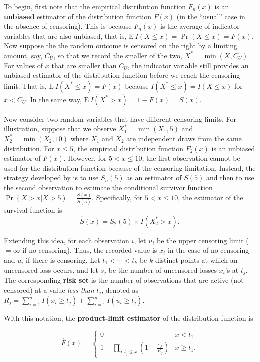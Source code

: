 \documentclass[]{book}
\theoremstyle{definition}
\theoremstyle{definition}
\theoremstyle{definition}
\theoremstyle{remark}
\begin{document}
To begin, first note that the empirical distribution function \(F_n(x)\)
is an \textbf{unbiased} estimator of the distribution function \(F(x)\)
(in the ``usual'' case in the absence of censoring). This is because
\(F_n(x)\) is the average of indicator variables that are also unbiased,
that is, \(\mathrm{E~} I(X \le x) = \Pr(X \le x) = F(x)\). Now suppose
the the random outcome is censored on the right by a limiting amount,
say, \(C_U\), so that we record the smaller of the two,
\(X^* = \min(X, C_U)\). For values of \(x\) that are smaller than
\(C_U\), the indicator variable still provides an unbiased estimator of
the distribution function before we reach the censoring limit. That is,
\(\mathrm{E~} I(X^* \le x) = F(x)\) because
\(I(X^* \le x) = I(X \le x)\) for \(x < C_U\). In the same way,
\(\mathrm{E~} I(X^* > x) = 1 -F(x) = S(x)\).

Now consider two random variables that have different censoring limits.
For illustration, suppose that we observe \(X_1^* = \min(X_1, 5)\) and
\(X_2^* = \min(X_2, 10)\) where \(X_1\) and \(X_2\) are independent
draws from the same distribution. For \(x \le 5\), the empirical
distribution function \(F_2(x)\) is an unbiased estimator of \(F(x)\).
However, for \(5 < x \le 10\), the first observation cannot be used for
the distribution function because of the censoring limitation. Instead,
the strategy developed by \citep{kaplan1958} is to use \(S_n(5)\) as an
estimator of \(S(5)\) and then to use the second observation to estimate
the conditional survivor function
\(\Pr(X > x | X >5) = \frac{S(x)}{S(5)}\). Specifically, for
\(5 < x \le 10\), the estimator of the survival function is \[
\hat{S}(x) = S_2(5) \times I(X_2^* > x ) .
\]

Extending this idea, for each observation \(i\), let \(u_i\) be the
upper censoring limit (\(=\infty\) if no censoring). Thus, the recorded
value is \(x_i\) in the case of no censoring and \(u_i\) if there is
censoring. Let \(t_{1} <\cdots< t_{k}\) be \(k\) distinct points at
which an uncensored loss occurs, and let \(s_j\) be the number of
uncensored losses \(x_i\)'s at \(t_{j}\). The corresponding \textbf{risk
set} is the number of observations that are active (not censored) at a
value \emph{less than} \(t_{j}\), denoted as
\(R_j = \sum_{i=1}^n I(x_i \geq t_{j}) + \sum_{i=1}^n I(u_i \geq t_{j})\).

With this notation, the \textbf{product-limit estimator} of the
distribution function is

\begin{equation}
\hat{F}(x) =
\left\{
\begin{array}{ll}
0 & x<t_{1} \\
1-\prod_{j:t_{j} \leq x}\left( 1-\frac{s_j}{R_{j}}\right) & x \geq t_{1} .
\end{array}
\right. \label{eq:KaplanMeier}
\end{equation}
\end{document}
